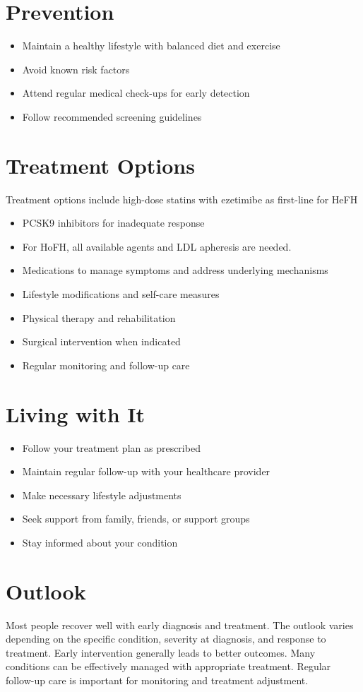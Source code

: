 \section{Prevention}
\begin{itemize}[noitemsep]
  \item Maintain a healthy lifestyle with balanced diet and exercise
  \item Avoid known risk factors
  \item Attend regular medical check-ups for early detection
  \item Follow recommended screening guidelines
\end{itemize}
\section{Treatment Options}
Treatment options include high-dose statins with ezetimibe as first-line for HeFH

\begin{itemize}[noitemsep]
  \item PCSK9 inhibitors for inadequate response
  \item For HoFH, all available agents and LDL apheresis are needed.
  \item Medications to manage symptoms and address underlying mechanisms
  \item Lifestyle modifications and self-care measures
  \item Physical therapy and rehabilitation
  \item Surgical intervention when indicated
  \item Regular monitoring and follow-up care
\end{itemize}
\section{Living with It}
\begin{itemize}[noitemsep]
  \item Follow your treatment plan as prescribed
  \item Maintain regular follow-up with your healthcare provider
  \item Make necessary lifestyle adjustments
  \item Seek support from family, friends, or support groups
  \item Stay informed about your condition
\end{itemize}
\section{Outlook}
Most people recover well with early diagnosis and treatment. The outlook varies depending on the specific condition, severity at diagnosis, and response to treatment. Early intervention generally leads to better outcomes. Many conditions can be effectively managed with appropriate treatment. Regular follow-up care is important for monitoring and treatment adjustment.
